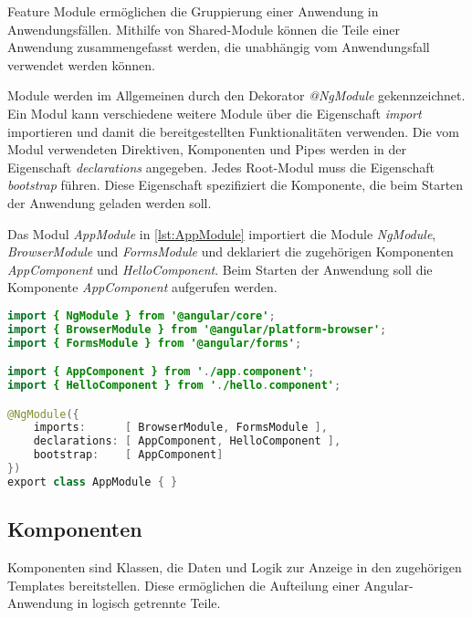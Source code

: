 Feature Module ermöglichen die Gruppierung einer Anwendung in Anwendungsfällen. Mithilfe von Shared-Module können die Teile einer Anwendung zusammengefasst werden, die unabhängig vom Anwendungsfall verwendet werden können. \autocites[vgl.][528\psqq]{Freeman.2018}[vgl.][]{Google.c}[vgl.][105\psqq]{Steyer.2017}

Module werden im Allgemeinen durch den Dekorator \textit{@NgModule} gekennzeichnet. Ein Modul kann verschiedene weitere Module über die Eigenschaft \textit{import} importieren und damit die bereitgestellten Funktionalitäten verwenden. Die vom Modul verwendeten Direktiven, Komponenten und Pipes werden in der Eigenschaft \textit{declarations} angegeben. Jedes Root-Modul muss die Eigenschaft \textit{bootstrap} führen. Diese Eigenschaft spezifiziert die Komponente, die beim Starten der Anwendung geladen werden soll. 

Das Modul \textit{AppModule} in \autoref{lst:AppModule} importiert die Module \textit{NgModule}, \textit{BrowserModule} und \textit{FormsModule} und deklariert die zugehörigen Komponenten \textit{AppComponent} und \textit{HelloComponent}. Beim Starten der Anwendung soll die Komponente \textit{AppComponent} aufgerufen werden.

\begin{lstlisting}[caption=Das Root-Module in der Datei app.module.ts, label=lst:AppModule, language=Java]
import { NgModule } from '@angular/core';
import { BrowserModule } from '@angular/platform-browser';
import { FormsModule } from '@angular/forms';

import { AppComponent } from './app.component';
import { HelloComponent } from './hello.component';

@NgModule({
	imports:      [ BrowserModule, FormsModule ],
	declarations: [ AppComponent, HelloComponent ],
	bootstrap:    [ AppComponent]
})
export class AppModule { }

\end{lstlisting}

\subsection{Komponenten}

Komponenten sind Klassen, die Daten und Logik zur Anzeige in den zugehörigen Templates bereitstellen. Diese ermöglichen die Aufteilung einer Angular-Anwendung in logisch getrennte Teile. \autocite[vgl.][401]{Freeman.2018} 

